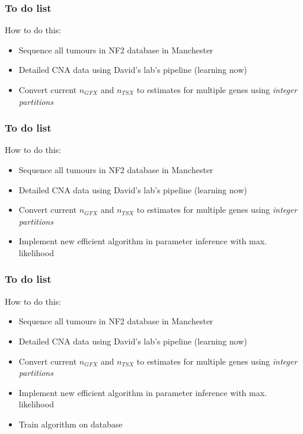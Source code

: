 \documentclass{beamer}
\begin{document}
\begin{frame}
    \frametitle{To do list}

    How to do this:
    \begin{itemize}
        \item Sequence all tumours in NF2 database in Manchester
        \item Detailed CNA data using David's lab's pipeline (learning now)
        \item Convert current $n_{GFX}$ and $n_{TSX}$ to estimates for multiple genes
        using \emph{integer partitions}
    \end{itemize}

    \;

\end{frame}

\begin{frame}
    \frametitle{To do list}

    How to do this:
    \begin{itemize}
        \item Sequence all tumours in NF2 database in Manchester
        \item Detailed CNA data using David's lab's pipeline (learning now)
        \item Convert current $n_{GFX}$ and $n_{TSX}$ to estimates for multiple genes
        using \emph{integer partitions}
        \item Implement new efficient algorithm in parameter inference with max.
        likelihood 
    \end{itemize}

    \;

\end{frame}

\begin{frame}
    \frametitle{To do list}

    How to do this:
    \begin{itemize}
        \item Sequence all tumours in NF2 database in Manchester
        \item Detailed CNA data using David's lab's pipeline (learning now)
        \item Convert current $n_{GFX}$ and $n_{TSX}$ to estimates for multiple genes
        using \emph{integer partitions}
        \item Implement new efficient algorithm in parameter inference with max.
        likelihood 
        \item Train algorithm on database
    \end{itemize}

    \;

\end{frame}
\end{document}
